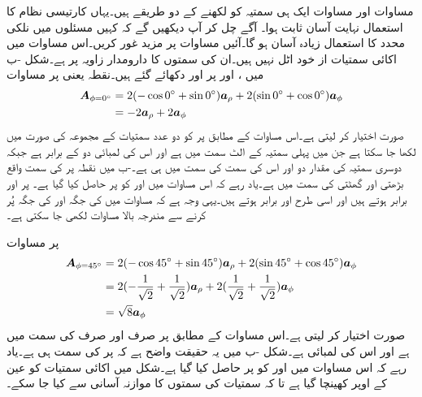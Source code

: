 مساوات  اور مساوات  ایک ہی سمتیہ کو لکھنے کے دو طریقے ہیں۔یہاں کارتیسی نظام کا استعمال نہایت آسان ثابت ہوا۔ آگے چل کر آپ دیکھیں گے کہ کہیں مسئلوں میں نلکی محدد کا استعمال زیادہ آسان ہو گا۔آئیں مساوات  پر مزید غور کریں۔اس مساوات میں اکائی سمتیات از خود اٹل نہیں ہیں۔ان کی سمتوں کا دارومدار زاویہ  پر ہے۔شکل  -ب میں ،  اور  پر  اور  دکھائے گئے ہیں۔نقطہ  یعنی  پر مساوات 
\begin{align*}
{\ensuremath{{\boldsymbol{A}}}}_{ \phi=0^\circ}&=2(- \cos 0^\circ + \sin 0^\circ ) {\boldsymbol{a}}_{\rho} +2( \sin 0^\circ  + \cos 0^\circ ){\boldsymbol{a}}_{\phi}\\
&=-2{\boldsymbol{a}}_{\rho}+2{\boldsymbol{a}}_{\phi}
\end{align*}
صورت اختیار کر لیتی ہے۔اس مساوات کے مطابق  پر  کو دو عدد سمتیات کے مجموعہ کی صورت میں لکھا جا سکتا ہے جن میں پہلی سمتیہ  کے الٹ سمت میں ہے اور اس کی لمبائی دو کے برابر ہے جبکہ دوسری سمتیہ کی مقدار دو اور اس کی سمت  کی سمت میں ہی ہے۔-ب میں نقطہ  پر  کی سمت واقع بڑھتی  اور گھٹتی  کی سمت میں ہے۔یاد رہے کہ اس مساوات میں  اور  کو  پر حاصل کیا گیا ہے۔ پر  اور  برابر ہوتے ہیں اور اسی طرح  اور  برابر ہوتے ہیں۔یہی وجہ ہے کہ مساوات  میں  کی جگہ  اور  کی جگہ  پُر کرنے سے مندرجہ بالا مساوات لکھی جا سکتی ہے۔

 پر مساوات 
\begin{align*}
{\ensuremath{{\boldsymbol{A}}}}_{\phi=45^\circ}&=2(- \cos 45^\circ + \sin 45^\circ ) {\boldsymbol{a}}_{\rho} +2( \sin 45^\circ  + \cos 45^\circ ){\boldsymbol{a}}_{\phi}\\
&=2(- \frac{1}{\sqrt{2}} +\frac{1}{\sqrt{2}} ) {\boldsymbol{a}}_{\rho} +2( \frac{1}{\sqrt{2}}  + \frac{1}{\sqrt{2}} ){\boldsymbol{a}}_{\phi}\\
&=\sqrt{8} {\boldsymbol{a}}_{\phi}
\end{align*}
صورت اختیار کر لیتی ہے۔اس مساوات کے مطابق  پر  صرف اور صرف  کی سمت میں ہے اور اس کی لمبائی  ہے۔شکل -ب میں یہ حقیقت واضح ہے کہ   پر  کی سمت  ہی ہے۔یاد رہے کہ اس مساوات میں  اور  کو  پر حاصل کیا گیا ہے۔شکل میں اکائی سمتیات کو عین  کے اوپر کھینچا گیا ہے تا کہ سمتیات کی سمتوں کا موازنہ آسانی سے کیا جا سکے۔

